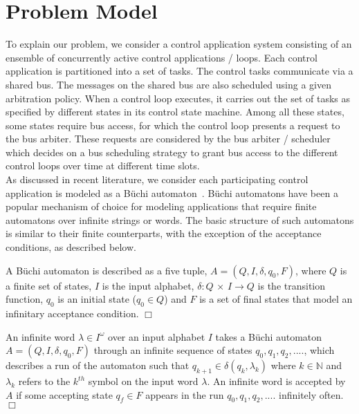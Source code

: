 \section{Problem Model} \label{sec3}
\noindent
To explain our problem, we consider a control application system consisting of an ensemble of concurrently active control applications / loops. Each control application is partitioned into a set of
tasks. The control tasks communicate via a shared bus. The messages on the shared bus are also scheduled using a given arbitration policy. When a control loop executes, it carries out the set of tasks as specified by different states in its control state machine. Among all these states, some
states require bus access, for which the control loop presents a request to the bus arbiter. These requests are considered by the bus arbiter / scheduler which decides on a bus scheduling strategy to grant bus access to the different control loops over time at different time slots. \\

\noindent
As discussed in recent literature, we consider each participating control application is modeled as a B\"{u}chi automaton~\cite{leeuwen90/Thomas90}. B\"{u}chi automatons have been a popular mechanism of choice for modeling applications that require finite automatons over infinite strings or words. The basic structure of such automatons is similar to their finite counterparts, with the exception of the acceptance conditions, as described below.
\begin{definition}
A B\"{u}chi automaton is described as a five tuple, 
$A = (Q,I,\delta,q_0,F)$, where $Q$ is a finite set of states, $I$ is the input alphabet, $\delta : Q$ $\times$ $I \rightarrow Q $ is the transition function, $q_0$ 
is an initial state ($q_0 \in Q$) and $F$ is a set of final states that model an infinitary acceptance condition. $\Box$ 
\end{definition}

\begin{definition}
An infinite word $\lambda \in I ^ \omega$ over an input alphabet $I$ takes a B\"{u}chi automaton $A = (Q,I,\delta,q_0,F)$ through an infinite sequence of states $ q_0, q_1, q_2, ....$, which describes a run of
the automaton such that $ q_{k+1} \in \delta(q_k, \lambda_k)$ where $k \in \mathbb{N}$ and $\lambda_k$ refers to the $k^{th}$ symbol on the input word $\lambda$. An infinite word is accepted by $A$ if some 
accepting state $q_f \in F $ appears in the run $ q_0, q_1, q_2, ....$ 
infinitely often. $\Box$ 
\end{definition}

